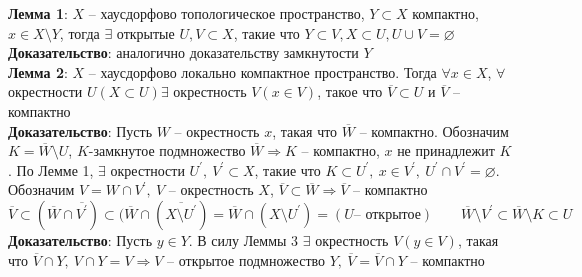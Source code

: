 	\textbf{Лемма 1}: $X$ -- хаусдорфово топологическое пространство, $Y\subset X$ компактно, $x\in X\setminus Y$, тогда $\exists$ открытые $U, V\subset X$, такие что $Y\subset V, X\subset U, U\cup V=\varnothing$ \\
	\textbf{Доказательство}: аналогично доказательству замкнутости $Y$\\
	\textbf{Лемма 2}: $X$ -- хаусдорфово локально компактное пространство. Тогда $\forall x\in X$, $\forall $ окрестности $U(X\subset U) \exists$ окрестность $V(x\in V)$, такое что $\overline{V}\subset U$ и $\overline{V}$ -- компактно\\
	\textbf{Доказательство}: Пусть $W$ -- окрестность $x$, такая что $\overline{W}$ -- компактно. Обозначим $K=\overline{W}\setminus U$, $K$-замкнутое подмножество $\overline{W} \Rightarrow K$ -- компактно, $x$ не принадлежит $K$. По Лемме 1, $\exists$ окрестности $U^{\prime},\ V^{\prime} \subset X$, такие что $K\subset U^{\prime},\ x\in V^{\prime},\ U^{\prime}\cap V^{\prime} = \varnothing$.\\
	Обозначим $V = W\cap V^{\prime},\ V$ -- окрестность $X$, $\overline{V}\subset\overline{W} \Rightarrow \overline{V}$ -- компактно\\
	$\overline{V}\subset(\overline{W}\cap\overline{V^{\prime}})\subset(\overline{W}\cap(\overline{X\setminus U^{\prime}}) = \overline{W}\cap (X\setminus U^{\prime}) = (U \text{-- открытое})\qquad \overline{W}\setminus V^{\prime} \subset \overline{W}\setminus K \subset U$ \\
	\textbf{Доказательство}: Пусть $y\in Y$. В силу Леммы 3 $\exists$ окрестность $V(y\in V)$, такая что $\overline{V}\cap Y,\ V\cap Y = V \Rightarrow V$ -- открытое подмножество $Y,\ \overline{V} = \overline{V}\cap Y$ -- компактно

\newpage
